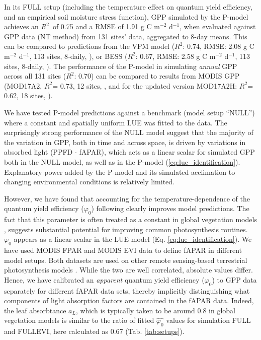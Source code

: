 \documentclass{myreport}
\newcommand{\rsq}{$R^2$}
\begin{document}
In its FULL setup (including the temperature effect on quantum yield efficiency, and an empirical soil moisture stress function), GPP simulated by the P-model achieves an \rsq\ of 0.75 and a RMSE of 1.91 g C m$^{-2}$ d$^{-1}$, when evaluated against GPP data (NT method) from 131 sites' data, aggregated to 8-day means. This can be compared to predictions from the VPM model (\rsq : 0.74, RMSE: 2.08 g C m$^{-2}$ d$^{-1}$, 113 sites, 8-daily, \cite{Zhang2017-yr}), or BESS (\rsq : 0.67, RMSE: 2.58 g C m$^{-2}$ d$^{-1}$, 113 sites, 8-daily, \cite{jiang16rse}). The performance of the P-model in simulating \textit{annual} GPP across all 131 sites (\rsq : 0.70) can be compared to results from MODIS GPP (MOD17A2, \rsq = 0.73, 12 sites, \cite{heinsch06}, and for the updated version MOD17A2H: \rsq = 0.62, 18 sites, \cite{wang17rs}). 

We have tested P-model predictions against a benchmark (model setup ``NULL'') where a constant and spatially uniform LUE was fitted to the data. The surprisingly strong performance of the NULL model suggest that the majority of the variation in GPP, both in time and across space, is driven by variations in absorbed light (PPFD $\cdot$ fAPAR), which acts as a linear scalar for simulated GPP both in the NULL model, as well as in the P-model (\ref{eq:lue_identification}). Explanatory power added by the P-model and its simulated acclimation to changing environmental conditions is relatively limited.

However, we have found that accounting for the temperature-dependence of the quantum yield efficiency ($\varphi_0$) following \cite{bernacchi03pce} clearly improves model predictions. The fact that this parameter is often treated as a constant in global vegetation models \citep{rogers17}, suggests substantial potential for improving common photosynthesis routines. $\varphi_0$ appears as a linear scalar in the LUE model (Eq. \ref{eq:lue_identification}). We have used MODIS FPAR and MODIS EVI data to define fAPAR in different model setups. Both datasets are used on other remote sensing-based terrestrial photosynthesis models \citep{Zhang2017-yr, jiang16rse}. While the two are well correlated, absolute values differ. Hence, we have calibrated an \textit{apparent} quantum yield efficiency ($\widehat{\varphi_0}$) to GPP data separately for different fAPAR data sets, thereby implicitly distinguishing what components of light absorption factors are contained in the fAPAR data. Indeed, the leaf absorbtance $a_L$, which is typically taken to be around 0.8 in global vegetation models \citep{rogers17} is similar to the ratio of fitted $\widehat{\varphi_0}$ values for simulation FULL and FULL\textunderscore EVI, here calculated as 0.67 (Tab. \ref{tab:setups}).
\end{document}
